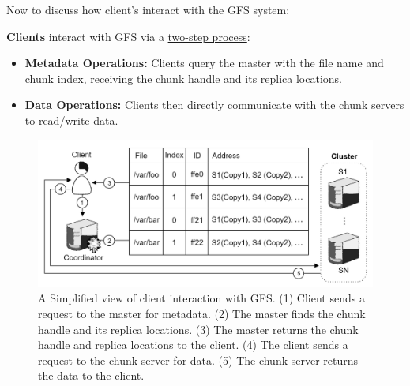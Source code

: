 \newpage

\noindent
Now to discuss how client's interact with the GFS system:
\begin{Def}

  \textbf{Clients} interact with GFS via a \underline{two-step process}:
  \begin{itemize}
    \item \textbf{Metadata Operations:} Clients query the master with the file name and chunk index, receiving the chunk handle and its replica locations.
    \item \textbf{Data Operations:} Clients then directly communicate with the chunk servers to read/write data.
  \end{itemize}
\end{Def}

\begin{figure}[h]
  \centering
  \includegraphics[width=\textwidth]{Sections/gfs/interaction.png}
  \caption{A Simplified view of client interaction with GFS. (1) Client sends a request to the master for metadata. (2) The master finds the chunk handle and its replica locations. 
  (3) The master returns the chunk handle and replica locations to the client. (4) The client sends a request to the chunk server for data. (5) The chunk server returns the data to the client.}
  \label{fig:gfs-client}
\end{figure}



    